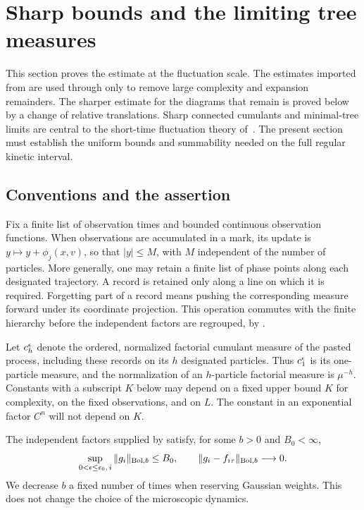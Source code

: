 \section{Sharp bounds and the limiting tree measures}
\label{sec:sharp-asymptotics}

This section proves the estimate at the fluctuation scale.  The estimates
imported from \cite{DHM2025} are used through
 only to remove large complexity and expansion
remainders.  The sharper estimate for the diagrams that remain is proved
below by a change of relative translations. Sharp connected cumulants
and minimal-tree limits are central to the short-time fluctuation
theory of~\cite{BGSS2023}. The present section must establish the
uniform bounds and summability needed on the full regular kinetic
interval.

\subsection{Conventions and the assertion}

Fix a finite list of observation times and bounded continuous observation
functions.  When observations are accumulated in a mark, its update is
\(y\mapsto y+\phi_j(x,v)\), so that \(|y|\le M\), with \(M\) independent
of the number of particles.  More generally, one may retain a finite list
of phase points along each designated trajectory.  A record is retained
only along a line on which it is required.  Forgetting part of a record
means pushing the corresponding measure forward under its coordinate
projection.  This operation commutes with the finite hierarchy before
the independent factors are regrouped, by
.

Let \(c_h^\epsilon\) denote the ordered, normalized factorial cumulant measure
of the pasted process, including these records on its \(h\) designated
particles.  Thus \(c_1^\epsilon\) is its one-particle measure, and the
normalization of an \(h\)-particle factorial measure is \(\mu^{-h}\).
Constants with a subscript \(K\) below may depend on a fixed upper bound
\(K\) for complexity, on the fixed observations, and on \(L\).  The
constant in an exponential factor \(C^n\) will not depend on \(K\).

The independent factors supplied by  satisfy, for
some \(b>0\) and \(B_0<\infty\),
\begin{equation}\label{eq:sharp-input-bounds}
 \sup_{0<\epsilon\le\epsilon_0,\,i}\|g_i\|_{\mathrm{Bol},b}\le B_0,
 \qquad
 \|g_i-f_{i\tau}\|_{\mathrm{Bol},b}\longrightarrow0.
\end{equation}
We decrease \(b\) a fixed number of times when reserving Gaussian
weights.  This does not change the choice of the microscopic dynamics.

